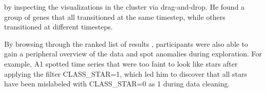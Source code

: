  by inspecting the visualizations
 in the cluster via drag-and-drop.
 He found a group of genes that all transitioned
 at the same timestep, while others transitioned
 at different timesteps.
 \par By browsing through the ranked list of
 results , participants were also able to gain a peripheral overview of the data and spot anomalies during exploration. For example, A1 spotted time series that were too faint to look like stars after applying the filter CLASS\_STAR=1,
 which led him to discover that all stars have been mislabeled with CLASS\_STAR=0 as 1 during data cleaning.
